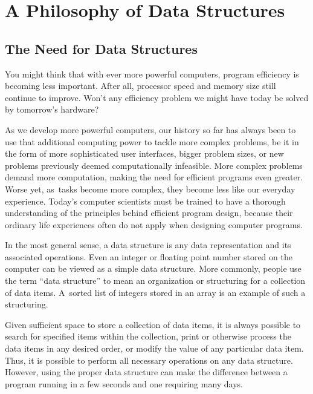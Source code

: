 \section{A Philosophy of Data Structures}

\subsection{The Need for Data Structures}

You might think that with ever more powerful computers,
program efficiency is becoming less important.
After all, processor speed and memory size still continue to improve.
Won't any efficiency problem we might have today be solved by
tomorrow's hardware?

As we develop more powerful computers,
our history so far has always been to use that additional computing
power to tackle more complex problems, be it in the form of more
sophisticated user interfaces, bigger problem sizes, or new problems
previously deemed computationally infeasible.
More complex problems demand more computation, making the need for
efficient programs even greater.
Worse yet, as~tasks become more complex, they become less like
our everyday experience.
Today's computer scientists must be trained to have a thorough
understanding of the principles behind efficient program design,
because their ordinary life experiences often do not apply when
designing computer programs.

In the most general sense, a data structure is any data representation
and its associated operations.
Even an integer or floating point
number stored on the computer can be viewed as a simple data
structure.
More commonly, people use the term ``data structure'' to mean
an organization or structuring for a collection of data items.
A~sorted list of integers stored in an array is an
example of such a structuring.

Given sufficient space to store a collection of data items, it is
always possible to search for specified items within the collection,
print or otherwise process the data items in any desired order, or
modify the value of any particular data item.
Thus, it is possible to perform all necessary operations on any data
structure.
However, using the proper data structure can make the difference
between a program running in a few seconds and one requiring many
days.

